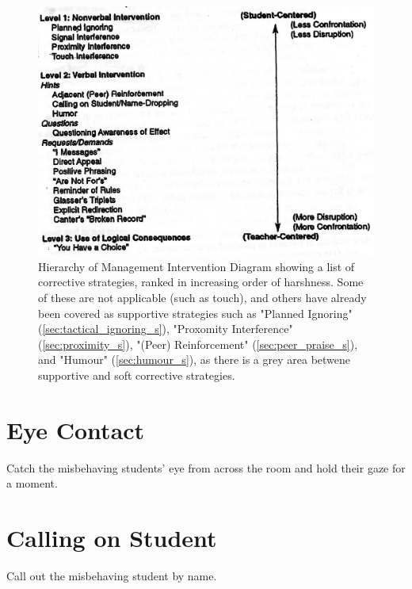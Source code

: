 \documentclass[12pt]{report}
\begin{document}
\begin{figure}[p]
\begin{center}
\includegraphics{./images/correctiveHierarchy.jpg}
\end{center}
\caption{Hierarchy of Management Intervention Diagram \cite{Levin2005} showing a list of corrective strategies, ranked in increasing order of harshness. Some of these are not applicable (such as touch), and others have already been covered as supportive strategies such as "Planned Ignoring" (\ref{sec:tactical_ignoring_s}), "Proxomity Interference" (\ref{sec:proximity_s}), "(Peer) Reinforcement" (\ref{sec:peer_praise_s}), and "Humour" (\ref{sec:humour_s}), as there is a grey area betwene supportive and soft corrective strategies. \label{fig:correctiveHierarchy}}
\end{figure}


\section{Eye Contact}
\label{sec:eye_contact_c}

Catch the misbehaving students' eye from across the room and hold their gaze for a moment\footnotemark. 



\section{Calling on Student}
\label{sec:use_names_c}

Call out the misbehaving student by name\footnotemark[\value{footnote}].
\end{document}

